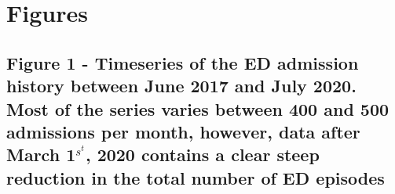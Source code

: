 \documentclass{bmcart}
\begin{document}






\section*{Figures}

\subsection*{Figure 1 - Timeseries of the ED admission history between June 2017 and July 2020. Most of the series varies between 400 and 500 admissions per month, however, data after March 1$^s^t$, 2020 contains a clear steep reduction in the total number of ED episodes}
\end{document}
